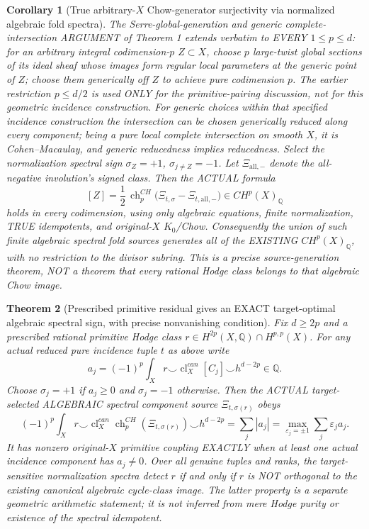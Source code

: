 \documentclass[11pt]{article}
\newtheorem{theorem}{Theorem}
\newtheorem{corollary}[theorem]{Corollary}
\begin{document}
\begin{corollary}[True arbitrary-$X$ Chow-generator surjectivity via normalized algebraic fold spectra]
The Serre-global-generation and generic
complete-intersection ARGUMENT of Theorem 1
extends verbatim to EVERY $1\le p\le d$:
for an arbitrary integral codimension-$p$
$Z\subset X$, choose $p$ large-twist
global sections of its ideal sheaf
whose images form regular local parameters
at the generic point of $Z$; choose them
generically off $Z$ to achieve pure
codimension $p$. The earlier restriction
$p\le d/2$ is used ONLY for the
primitive-pairing discussion, not for
this geometric incidence construction.
For generic choices within that
specified incidence construction the
intersection can be chosen generically
reduced along every component; being a
pure local complete intersection on
smooth $X$, it is Cohen--Macaulay, and
generic reducedness implies reducedness.
Select the normalization spectral sign
$\sigma_Z=+1$, $\sigma_{j\ne Z}=-1$.
Let $\Xi_{\mathrm{all},-}$ denote the
all-negative involution's signed class.
Then the ACTUAL formula
\[
 \boxed{
 [Z]=\frac12\,\operatorname{ch}_p^{CH}
 \bigl(\Xi_{t,\sigma}-\Xi_{t,\mathrm{all},-}\bigr)
 \in CH^p(X)_{\mathbb Q}
 }                                                        \tag{10}
\]
holds in every codimension, using
only algebraic equations, finite
normalization, TRUE idempotents, and
original-$X$ $K_0$/Chow.
Consequently the union of such
finite algebraic spectral fold sources
generates all of the EXISTING
$CH^p(X)_{\mathbb Q}$, with no
restriction to the divisor subring.
This is a precise source-generation
theorem, NOT a theorem that every
rational Hodge class belongs to
that algebraic Chow image.
\end{corollary}

\begin{theorem}[Prescribed primitive residual gives an EXACT target-optimal algebraic spectral sign, with precise nonvanishing condition]
Fix $d\ge 2p$ and a prescribed
rational primitive Hodge class
$r\in H^{2p}(X,\mathbb Q)\cap H^{p,p}(X)$.
For any actual reduced pure
incidence tuple $t$ as above write
\[
 a_j=(-1)^p\int_X
 r\smile\operatorname{cl}^{can}_X[C_j]
         \smile h^{d-2p}\in\mathbb Q .
\]
Choose $\sigma_j=+1$ if $a_j\ge0$
and $\sigma_j=-1$ otherwise.
Then the ACTUAL target-selected
ALGEBRAIC spectral component source
$\Xi_{t,\sigma(r)}$ obeys
\[
 \boxed{
 (-1)^p\int_Xr\smile
   \operatorname{cl}^{can}_X
      \operatorname{ch}^{CH}_p(\Xi_{t,\sigma(r)})
             \smile h^{d-2p}
       =\sum_j|a_j|
       =\max_{\varepsilon_j=\pm1}
                      \sum_j\varepsilon_j a_j .
 }                                                        \tag{11}
\]
It has nonzero original-$X$ primitive
coupling EXACTLY when at least one
actual incidence component has
$a_j\ne0$.
Over all genuine tuples and ranks,
the target-sensitive normalization
spectra detect $r$ if and only if
$r$ is NOT orthogonal to the
existing canonical algebraic
cycle-class image.
The latter property is a separate
geometric arithmetic statement; it
is not inferred from mere Hodge
purity or existence of the spectral
idempotent.
\end{theorem}
\end{document}

